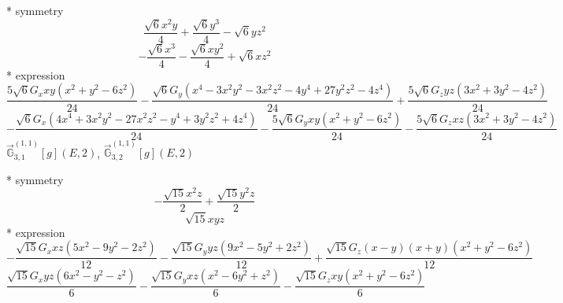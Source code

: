 \documentclass[fleqn,8pt]{jsarticle}
\begin{document}
\noindent\quad ** symmetry
\begin{dmath*}
\frac{\sqrt{6} x^{2} y}{4} + \frac{\sqrt{6} y^{3}}{4} - \sqrt{6} y z^{2}
\end{dmath*}
\begin{dmath*}
- \frac{\sqrt{6} x^{3}}{4} - \frac{\sqrt{6} x y^{2}}{4} + \sqrt{6} x z^{2}
\end{dmath*}
\noindent\quad ** expression
\begin{dmath*}
\frac{5 \sqrt{6} G_{x} x y \left(x^{2} + y^{2} - 6 z^{2}\right)}{24} - \frac{\sqrt{6} G_{y} \left(x^{4} - 3 x^{2} y^{2} - 3 x^{2} z^{2} - 4 y^{4} + 27 y^{2} z^{2} - 4 z^{4}\right)}{24} + \frac{5 \sqrt{6} G_{z} y z \left(3 x^{2} + 3 y^{2} - 4 z^{2}\right)}{24}
\end{dmath*}
\begin{dmath*}
- \frac{\sqrt{6} G_{x} \left(4 x^{4} + 3 x^{2} y^{2} - 27 x^{2} z^{2} - y^{4} + 3 y^{2} z^{2} + 4 z^{4}\right)}{24} - \frac{5 \sqrt{6} G_{y} x y \left(x^{2} + y^{2} - 6 z^{2}\right)}{24} - \frac{5 \sqrt{6} G_{z} x z \left(3 x^{2} + 3 y^{2} - 4 z^{2}\right)}{24}
\end{dmath*}
\noindent\quad $\vec{\mathbb{G}}_{3,1}^{(1,1)}[g](E,2)$, $\vec{\mathbb{G}}_{3,2}^{(1,1)}[g](E,2)$

\noindent\quad ** symmetry
\begin{dmath*}
- \frac{\sqrt{15} x^{2} z}{2} + \frac{\sqrt{15} y^{2} z}{2}
\end{dmath*}
\begin{dmath*}
\sqrt{15} x y z
\end{dmath*}
\noindent\quad ** expression
\begin{dmath*}
- \frac{\sqrt{15} G_{x} x z \left(5 x^{2} - 9 y^{2} - 2 z^{2}\right)}{12} - \frac{\sqrt{15} G_{y} y z \left(9 x^{2} - 5 y^{2} + 2 z^{2}\right)}{12} + \frac{\sqrt{15} G_{z} \left(x - y\right) \left(x + y\right) \left(x^{2} + y^{2} - 6 z^{2}\right)}{12}
\end{dmath*}
\begin{dmath*}
\frac{\sqrt{15} G_{x} y z \left(6 x^{2} - y^{2} - z^{2}\right)}{6} - \frac{\sqrt{15} G_{y} x z \left(x^{2} - 6 y^{2} + z^{2}\right)}{6} - \frac{\sqrt{15} G_{z} x y \left(x^{2} + y^{2} - 6 z^{2}\right)}{6}
\end{dmath*}
\end{document}
